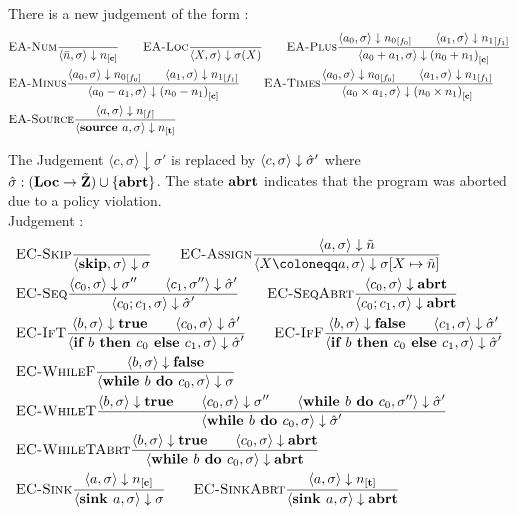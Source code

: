 \iffalse
There is a new judgement of the form 
:
\begin{align*}
    &\bsrule{EA-Num}{}{\bigstep{\literalint}{\store}{\clean}} \qquad
    \bsrule{EA-Loc}{}{\bigstep{X}{\store}{\store(X)}}\qquad
    \bsrule{EA-Plus}
    {\bigstep{a_0}{\store}{\flagged[n_0][0]}
    \qquad \bigstep{a_1}{\store}{\flagged[n_1][1]}}
    {\bigstep{a_0+a_1}{\store}{\clean[(n_0+n_1)]}}\\
    &\bsrule{EA-Minus}
    {\bigstep{a_0}{\store}{\flagged[n_0][0]}
    \qquad \bigstep{a_1}{\store}{\flagged[n_1][1]}}
    {\bigstep{a_0-a_1}{\store}{\clean[(n_0-n_1)]}} \qquad
    \bsrule{EA-Times}
    {\bigstep{a_0}{\store}{\flagged[n_0][0]}
    \qquad \bigstep{a_1}{\store}{\flagged[n_1][1]}}
    {\bigstep{a_0 \times a_1}{\store}{\clean[(n_0 \times n_1)]}}\\
    &\bsrule{EA-Source}{\bigstep{a}{\store}{\flagged}}
    {\bigstep{\source{a}}{\store}{\tracked}}
\end{align*}

The Judgement $\langle c, \sigma \rangle \downarrow \sigma'$ is replaced by 
$\langle c, \sigma \rangle \downarrow \hat{\sigma}'$
where $\hat{\sigma}{}: (\textbf{Loc} \to \tilde{\textbf{Z}}) \cup \{\textbf{abrt}\}$.
The state $\textbf{abrt}$ indicates that the program was aborted due to a policy violation.
\\
Judgement :
\begin{align*}
    &\bsrule{EC-Skip}{}{\bigstep{\skipcmd}{\store}{\store}}\qquad
    \bsrule{EC-Assign}{\bigstep{a}{\store}{\flaggedn{}}}
    {\bigstep{\defaultstore}{\store}{\store{}[X \mapsto \flaggedn{}]}}\\
    &\bsrule{EC-Seq}{\bigstep{c_0}{\sigma}{\store''} \qquad \bigstep{c_1}{\store''}{\excstore'}}
    {\bigstep{\defaultseq}{\store}{\excstore'}}\qquad
    \bsrule{EC-SeqAbrt}{\bigstep{c_0}{\sigma}{\exception}}
    {\bigstep{\defaultseq}{\store}{\exception}} \\
    &\bsrule{EC-IfT}{\bigstep{b}{\store}{\btrue}\qquad \bigstep{c_0}{\store}{\excstore'}}
    {\bigstep{\defaultif}{\store}{\excstore'}} \qquad
    \bsrule{EC-IfF}{\bigstep{b}{\store}{\bfalse}\qquad \bigstep{c_1}{\store}{\excstore'}}
    {\bigstep{\defaultif}{\store}{\excstore'}}\\
    &\bsrule{EC-WhileF}{\bigstep{b}{\sigma}{\bfalse}}
    {\bigstep{\defaultwhile}{\store}{\store}} \\
    &\bsrule{EC-WhileT}{\bigstep{b}{\sigma}{\btrue} \qquad \bigstep{c_0}{\store}{\store''}\qquad
    \bigstep{\defaultwhile}{\store''}{\excstore'}}
    {\bigstep{\defaultwhile}{\store}{\excstore'}}\\
    &\bsrule{EC-WhileTAbrt}{\bigstep{b}{\sigma}{\btrue} \qquad \bigstep{c_0}{\store}{\exception}}
    {\bigstep{\defaultwhile}{\store}{\exception}}\\
    &\bsrule{EC-Sink}{\bigstep{a}{\store}{\clean{}}}
    {\bigstep{\defaultsink}{\store}{\store}} \qquad
    \bsrule{EC-SinkAbrt}{\bigstep{a}{\store}{\tracked{}}}
    {\bigstep{\defaultsink}{\store}{\exception}}\\
\end{align*}

